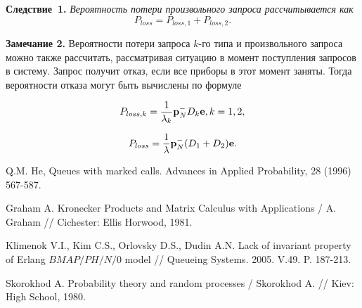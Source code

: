 \documentclass[12pt, a4paper]{article}
\begin{document}
	
	
	
	{\bf Следствие~1.} {\itshape Вероятность потери произвольного запроса    рассчитывается как
		$$
		P_{loss}=P_{loss,1}+P_{loss,2}.
		$$
	}
	
	{\bf Замечание 2.} Вероятности потери запроса $k$-го типа и произвольного запроса можно также рассчитать, рассматривая 
	ситуацию в момент поступления  запросов в систему. Запрос  получит отказ, если все приборы в этот момент заняты. Тогда 
	вероятности отказа могут  быть вычислены по формуле
	
	$$
	P_{loss, k}=\frac{1}{\lambda_k}{\bf p}_N^{-}D_k{\bf e}, k=1,2,
	$$
	
	$$
	P_{loss}=\frac{1}{\lambda}{\bf p}_N^{-}(D_1+D_2){\bf e}.
	$$
	
	
	\begin{thebibliography}{20}
		
		Q.M. He, Queues with marked calls. Advances in Applied
		Probability, 28 (1996)  567-587.
		
		Graham A.  Kronecker Products and Matrix Calculus with
		Applications /  A. Graham // Cichester:
		Ellis  Horwood, 1981.
		
		
		Klimenok V.I., Kim C.S., Orlovsky D.S., Dudin A.N. Lack of invariant property of  Erlang $BMAP/PH/N/0$ model // Queueing 
		Systems. 2005. V.49. P. 187-213.
		
		Skorokhod A. Probability theory and random processes / Skorokhod A.
		// Kiev: High School, 1980.
		
		
		
	\end{thebibliography}
	
	
\end{document}
